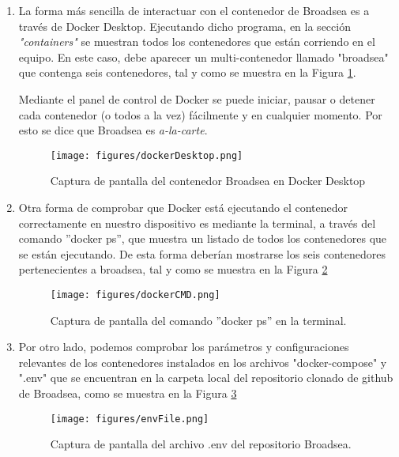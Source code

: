 \begin{enumerate} 

    \item La forma más sencilla de interactuar con el contenedor de Broadsea es a través de Docker Desktop. Ejecutando dicho programa, en la sección \textit{"containers"} se muestran todos los contenedores que están corriendo en el equipo. En este caso, debe aparecer un multi-contenedor llamado "broadsea" que contenga seis contenedores, tal y como se muestra en la Figura \ref{fig:dockerDesktop}.
    
    Mediante el panel de control de Docker se puede iniciar, pausar o detener cada contenedor (o todos a la vez) fácilmente y en cualquier momento. Por esto se dice que Broadsea es \textit{a-la-carte}.
    
\begin{figure}[H]
    \centering
    \texttt{[image: figures/dockerDesktop.png]}
    \caption{Captura de pantalla del contenedor Broadsea en Docker Desktop}
    \label{fig:dockerDesktop}
\end{figure}

    \item Otra forma de comprobar que Docker está ejecutando el contenedor correctamente en nuestro dispositivo es mediante la terminal, a través del comando ''docker ps'', que muestra un listado de todos los contenedores que se están ejecutando. De esta forma deberían mostrarse los seis contenedores pertenecientes a broadsea, tal y como se muestra en la Figura \ref{fig:dockerCMD}

\begin{figure}[H]
    \centering
    \texttt{[image: figures/dockerCMD.png]}
    \caption{Captura de pantalla del comando ''docker ps'' en la terminal.}
    \label{fig:dockerCMD}
\end{figure}
    
    \item Por otro lado, podemos comprobar los parámetros y configuraciones relevantes de los contenedores instalados en los archivos "docker-compose" y ".env" que se encuentran en la carpeta local del repositorio clonado de github de Broadsea, como se muestra en la Figura \ref{fig:envFile}

    \begin{figure}[H]
    \centering
    \texttt{[image: figures/envFile.png]}
    \caption{Captura de pantalla del archivo .env del repositorio Broadsea.}
    \label{fig:envFile}
\end{figure}


\end{enumerate}
